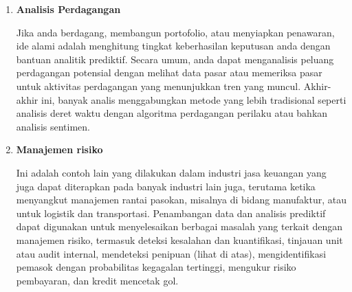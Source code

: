 \begin{enumerate}
\item \textbf{Analisis Perdagangan}
\par Jika anda berdagang, membangun portofolio, atau menyiapkan penawaran, ide alami adalah menghitung tingkat keberhasilan keputusan anda dengan bantuan analitik prediktif. Secara umum, anda dapat menganalisis peluang perdagangan potensial dengan melihat data pasar atau memeriksa pasar untuk aktivitas perdagangan yang menunjukkan tren yang muncul. Akhir-akhir ini, banyak analis menggabungkan metode yang lebih tradisional seperti analisis deret waktu dengan algoritma perdagangan perilaku atau bahkan analisis sentimen.

\item  \textbf{Manajemen risiko}
\par Ini adalah contoh lain yang dilakukan dalam industri jasa keuangan yang juga dapat diterapkan pada banyak industri lain juga, terutama ketika menyangkut manajemen rantai pasokan, misalnya di bidang manufaktur, atau untuk logistik dan transportasi. Penambangan data dan analisis prediktif dapat digunakan untuk menyelesaikan berbagai masalah yang terkait dengan manajemen risiko, termasuk deteksi kesalahan dan kuantifikasi, tinjauan unit atau audit internal, mendeteksi penipuan (lihat di atas), mengidentifikasi pemasok dengan probabilitas kegagalan tertinggi, mengukur risiko pembayaran, dan kredit mencetak gol.

\end{enumerate}

